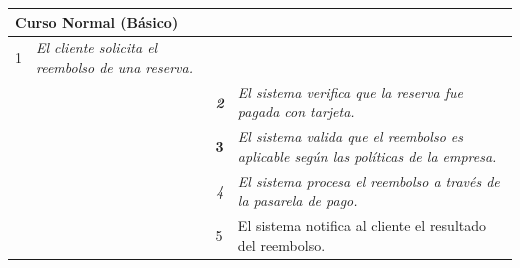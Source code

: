 \begin{table}[H]
    \begin{tabular}{llllllll}
    \hline
    \multicolumn{8}{|l|}{\cellcolor[HTML]{F2F2F2}Curso Normal (Básico)}                                                                                                                                                                                                                                                                          \\ \hline
    \multicolumn{1}{|c|}{1}  & \multicolumn{1}{l|}{{\color[HTML]{808080} \textit{El cliente solicita el reembolso de una reserva.}}} & \multicolumn{1}{l|}{{\color[HTML]{808080} }}                    & \multicolumn{5}{l|}{{\color[HTML]{808080} }}                                                                                            \\ \hline
    \multicolumn{1}{|c|}{}   & \multicolumn{1}{l|}{{\color[HTML]{808080} \textit{}}}                                                 & \multicolumn{1}{c|}{{\color[HTML]{808080} \textit{\textbf{2}}}} & \multicolumn{5}{p{6cm}|}{{\color[HTML]{808080} \textit{El sistema verifica que la reserva fue pagada con tarjeta.}}}                         \\ \hline
    \multicolumn{1}{|l|}{}   & \multicolumn{1}{l|}{{\color[HTML]{808080} }}                                                          & \multicolumn{1}{l|}{{\color[HTML]{808080} \textbf{3}}}          & \multicolumn{5}{p{6cm}|}{{\color[HTML]{808080} \textit{El sistema valida que el reembolso es aplicable según las políticas de la empresa.}}} \\ \hline
    \multicolumn{1}{|l|}{}   & \multicolumn{1}{l|}{{\color[HTML]{808080} }}                                                          & \multicolumn{1}{c|}{{\color[HTML]{808080} \textit{4}}}          & \multicolumn{5}{p{6cm}|}{{\color[HTML]{808080} \textit{El sistema procesa el reembolso a través de la pasarela de pago.}}}                   \\ \hline
    \multicolumn{1}{|l|}{}   & \multicolumn{1}{l|}{{\color[HTML]{808080} }}                                                          & \multicolumn{1}{l|}{{\color[HTML]{808080} 5}}                   & \multicolumn{5}{p{6cm}|}{{\color[HTML]{808080} El sistema notifica al cliente el resultado del reembolso.}}                                  \\ \hline
    \end{tabular}
    \end{table}

